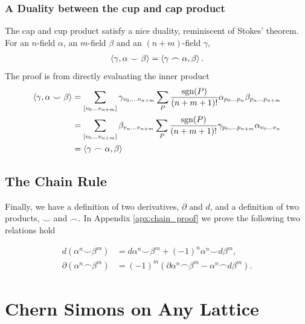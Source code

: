 \documentclass[11pt, oneside]{article} %
\numberwithin{equation}{section}
\begin{document}
\subsubsection{A Duality between the cup and cap product}
The cap and cup product satisfy a nice duality, reminiscent of Stokes' theorem. For an $n$-field $\alpha$, an $m$-field $\beta$ and an $(n+m)$-field $\gamma$,
\begin{align}
    \left \langle \gamma, \alpha \smile \beta \right \rangle
    =
    \left \langle \gamma \frown \alpha , \beta  \right \rangle.
\end{align}
The proof is from directly evaluating the inner product
\begin{align}
    \left \langle  \gamma,\alpha \smile \beta \right \rangle &=
    \sum_{[v_0 ... v_{n+m}]} \gamma_{v_0,...v_{n+m}}
    \sum_{P}\frac{\textup{sgn}(P)}{(n+m+1)!}
    \alpha_{p_0...p_n}\beta_{p_n...p_{n+m}} \\
    &= \sum_{[v_0 ... v_{n+m}]}
    \beta_{v_n...v_{n+m}}
    \sum_{P}\frac{\textup{sgn}(P)}{(n+m+1)!}
    \gamma_{p_0,...p_{n+m}}
    \alpha_{v_0...v_n}\\
    &= \left \langle \gamma \frown \alpha , \beta  \right \rangle
\end{align}

\subsection{The Chain Rule}
Finally, we have a definition of two derivatives, $\partial$ and $d$, and a definition of two products, $\smile$ and $\frown$. In Appendix \ref{apx:chain_proof} we prove the following two relations hold

\begin{align}
    d (\alpha^n \smile \beta^m) &= 
    d \alpha^n \smile \beta^m + 
    (-1)^n \alpha^n \smile d\beta^m,\\
    \partial (\alpha^n \frown \beta^m) &= 
    (-1)^m 
    \left (
    \partial \alpha^n \frown \beta^m - 
    \alpha^n \frown d\beta^m
    \right ).
\end{align}

\section{Chern Simons on Any Lattice}
\end{document}

